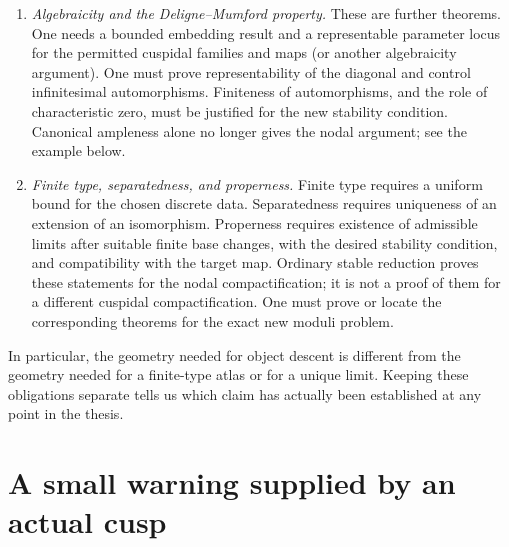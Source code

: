 \begin{enumerate}
\item \emph{Algebraicity and the Deligne--Mumford property.}
These are further theorems. One needs a bounded embedding result
and a representable parameter locus for the permitted cuspidal
families and maps (or another algebraicity argument). One must
prove representability of the diagonal and control infinitesimal
automorphisms. Finiteness of automorphisms, and the role of
characteristic zero, must be justified for the new stability
condition. Canonical ampleness alone no longer gives the nodal
argument; see the example below.

\item \emph{Finite type, separatedness, and properness.}
Finite type requires a uniform bound for the chosen discrete data.
Separatedness requires uniqueness of an extension of an
isomorphism. Properness requires existence of admissible limits
after suitable finite base changes, with the desired stability
condition, and compatibility with the target map. Ordinary stable
reduction proves these statements for the nodal compactification;
it is not a proof of them for a different cuspidal compactification.
One must prove or locate the corresponding theorems for the exact
new moduli problem.
\end{enumerate}

In particular, the geometry needed for object descent is different
from the geometry needed for a finite-type atlas or for a unique
limit. Keeping these obligations separate tells us which claim
has actually been established at any point in the thesis.

\section{A small warning supplied by an actual cusp}

